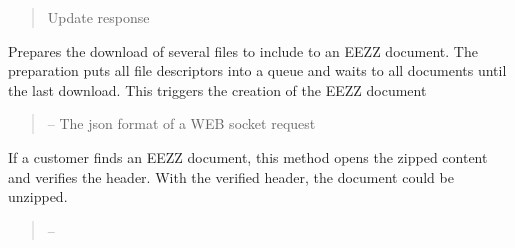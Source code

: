 \documentclass[letterpaper,10pt,english]{sphinxmanual}
\begin{document}
\begin{savenotes}
\begin{fulllineitems}
\begin{savenotes}
\begin{fulllineitems}
\begin{quote}
\begin{description}
\begin{itemize}
\end{itemize}

\sphinxAtStartPar
Update response

\end{description}\end{quote}

\end{fulllineitems}\end{savenotes}


\begin{savenotes}\begin{fulllineitems}
\label{\detokenize{eezz:eezz.document.TDocuments.prepare_download}}
\pysigstartsignatures
{}
\pysigstopsignatures
\sphinxAtStartPar
Prepares the download of several files to include to an EEZZ document.
The preparation puts all file descriptors into a queue and waits to all documents until the last download.
This triggers the creation of the EEZZ document
\begin{quote}\begin{description}
\sphinxAtStartPar
{} – The json format of a WEB socket request

\end{description}\end{quote}

\end{fulllineitems}\end{savenotes}


\begin{savenotes}\begin{fulllineitems}
\label{\detokenize{eezz:eezz.document.TDocuments.read_document_header}}
\pysigstartsignatures
{}
\pysigstopsignatures
\sphinxAtStartPar
If a customer finds an EEZZ document, this method opens the zipped content and verifies the header.
With the verified header, the document could be unzipped.
\begin{quote}\begin{description}
\sphinxAtStartPar
{} – 


\end{description}
\end{quote}
\end{fulllineitems}
\end{savenotes}
\end{fulllineitems}
\end{savenotes}
\end{document}
